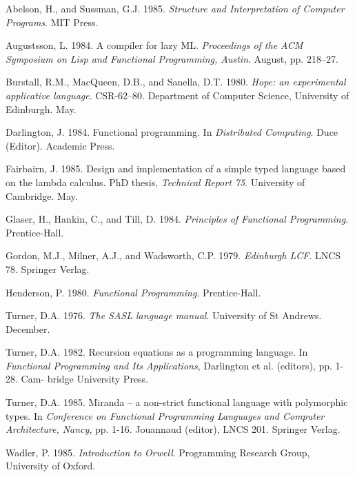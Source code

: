 \begin{references}
	\item Abelson, H., and Sussman, G.J. 1985. \textit{Structure and Interpretation of Computer
	Programs}. MIT Press.
	\item  Augustsson, L. 1984. A compiler for lazy ML. \textit{Proceedings of the ACM Symposium on
	Lisp and Functional Programming, Austin}. August, pp. 218--27.
	\item Burstall, R.M., MacQueen, D.B., and Sanella, D.T. 1980. \textit{Hope: an experimental
	applicative language}. CSR-62--80. Department of Computer Science, University of
	Edinburgh. May.
	\item  Darlington, J. 1984. Functional programming. In \textit{Distributed Computing}. Duce
(Editor). Academic Press.
	\item  Fairbairn, J. 1985. Design and implementation of a simple typed language based on the
lambda calculus. PhD thesis, \textit{Technical Report 75}. University of Cambridge. May.
	\item  Glaser, H., Hankin, C., and Till, D. 1984. \textit{Principles of Functional Programming}.
Prentice-Hall.
	\item  Gordon, M.J., Milner, A.J., and Wadsworth, C.P. 1979. \textit{Edinburgh LCF}. LNCS 78.
Springer Verlag.
	\item  Henderson, P. 1980. \textit{Functional Programming}. Prentice-Hall.
	\item  Turner, D.A. 1976. \textit{The SASL language manual}. University of St Andrews. December.
	\item  Turner, D.A. 1982. Recursion equations as a programming language. In \textit{Functional
Programming and Its Applications}, Darlington et al. (editors), pp. 1-28. Cam-
bridge University Press.
	\item  Turner, D.A. 1985. Miranda -- a non-strict functional language with polymorphic
types. In \textit{Conference on Functional Programming Languages and Computer
Architecture, Nancy}, pp. 1-16. Jouannaud (editor), LNCS 201. Springer Verlag.
	\item  Wadler, P. 1985. \textit{Introduction to Orwell}. Programming Research Group, University of
Oxford.
\end{references}
